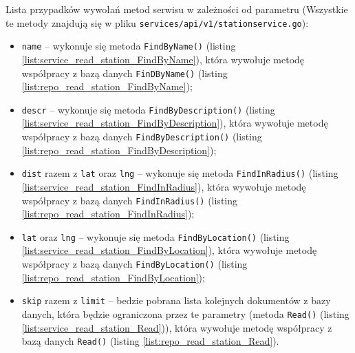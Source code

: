 Lista przypadków wywołań metod serwisu w zależności od parametru (Wszystkie te metody znajdują się w pliku \texttt{services/api/v1/stationservice.go}):
\begin{itemize}
    \item \texttt{name} -- wykonuje się metoda \texttt{FindByName()} (listing \ref{list:service_read_station_FindByName}), która wywołuje metodę współpracy z bazą danych \texttt{FinDByName()} (listing \ref{list:repo_read_station_FindByName});
    \item \texttt{descr} -- wykonuje się metoda \texttt{FindByDescription()} (listing \ref{list:service_read_station_FindByDescription}), która wywołuje metodę współpracy z bazą danych \texttt{FindByDescription()} (listing \ref{list:repo_read_station_FindByDescription});
    \item \texttt{dist} razem z \texttt{lat} oraz \texttt{lng} -- wykonuje się metoda \texttt{FindInRadius()} (listing \ref{list:service_read_station_FindInRadius}), która wywołuje metodę współpracy z bazą danych \texttt{FindInRadius()} (listing \ref{list:repo_read_station_FindInRadius});
    \item \texttt{lat} oraz \texttt{lng} -- wykonuje się metoda \texttt{FindByLocation()} (listing \ref{list:service_read_station_FindByLocation}), która wywołuje metodę współpracy z bazą danych \texttt{FindByLocation()} (listing \ref{list:repo_read_station_FindByLocation});
    \item \texttt{skip} razem z \texttt{limit} -- bedzie pobrana lista kolejnych dokumentów z bazy danych, która będzie ograniczona przez te parametry (metoda \texttt{Read()} (listing \ref{list:service_read_station_Read})), która wywołuje metodę współpracy z bazą danych \texttt{Read()} (listing \ref{list:repo_read_station_Read}).
\end{itemize}

